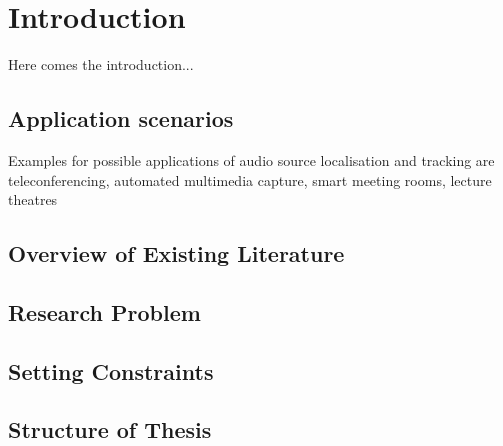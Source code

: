 \chapter{Introduction}
\label{chap:intro}
Here comes the introduction...
\section{Application scenarios}
Examples for possible applications of audio source localisation and tracking are teleconferencing, automated multimedia capture, smart meeting rooms, lecture theatres \cite{Lehmann2007}
\section{Overview of Existing Literature}
\section{Research Problem}
\section{Setting Constraints}
\section{Structure of Thesis}
